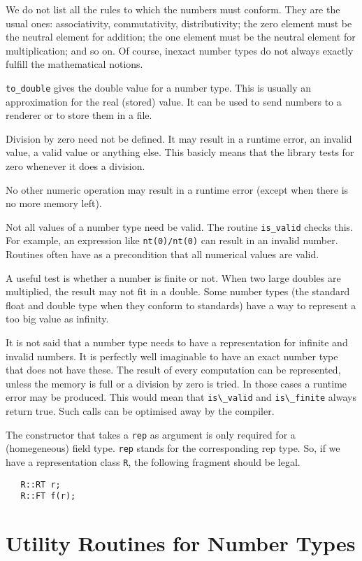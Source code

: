 \documentclass[]{article}
\begin{document}
We do not list all the rules to which the numbers must conform.
They are the usual ones: associativity, commutativity, distributivity;
the zero element must be the neutral element for addition;
the one element must be the neutral element for multiplication; and so on.
Of course, inexact number types do not always exactly fulfill the mathematical
notions.

\verb~to_double~ gives the double value for a number type.
This is usually an approximation for the real (stored) value.
It can be used to send numbers to a renderer or to store them in a file.

Division by zero need not be defined. It may result in a runtime error, an
invalid value, a valid value or anything else. This basicly means that the
library tests for zero whenever it does a division.

No other numeric operation may result in a runtime error (except when there is
no more memory left).

Not all values of a number type need be valid. The routine \verb~is_valid~
checks this. For example, an expression like \verb~nt(0)/nt(0)~ can result in
an invalid number. Routines often have as a precondition that all numerical
values are valid.

A useful test is whether a number is finite or not.
When two large doubles are multiplied, the result may not fit in a double.
Some number types (the standard float and double type when they conform to
standards) have a way to represent a too big value as infinity.

It is not said that a number type needs to have a representation for infinite
and invalid numbers. It is perfectly well imaginable to have an exact number
type that does not have these. The result of every computation can be
represented, unless the memory is full or a division by zero is tried.
In those cases a runtime error may be produced. This would mean that
\verb~is\_valid~ and \verb~is\_finite~ always return true. Such calls can be
optimised away by the compiler.

The constructor that takes a \verb~rep~ as argument is only required for a
(homegeneous) field type. \verb~rep~ stands for the corresponding rep
type. So, if we have a representation class {\tt R}, the following 
fragment should be legal.
\begin{verbatim}
   R::RT r;
   R::FT f(r);
\end{verbatim}




\section{Utility Routines for Number Types}
\end{document}
